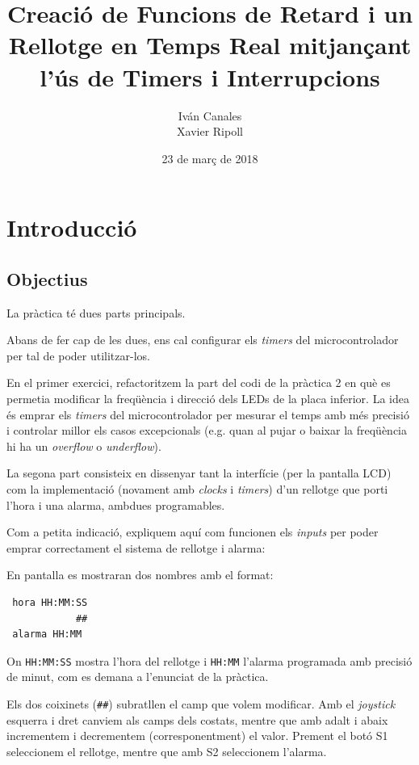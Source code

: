 \documentclass{../pdae} %
\title{Creació de Funcions de Retard i un Rellotge en Temps Real mitjançant
l’ús de Timers i Interrupcions}
\author{
    Iván Canales\\
    Xavier Ripoll
}
\date{23 de març de 2018}
\begin{document}
\maketitle

\section{Introducció}

\subsection{Objectius}

La pràctica té dues parts principals.

Abans de fer cap de les dues, ens cal configurar els \textit{timers} del
microcontrolador per tal de poder utilitzar-los.

En el primer exercici, refactoritzem la part del
codi de la pràctica 2 en què es permetia modificar la freqüència i direcció
dels LEDs de la placa inferior. La idea és emprar els \textit{timers} del
microcontrolador per mesurar el temps amb més precisió i controlar millor
els casos excepcionals (e.g. quan al pujar o baixar la freqüència hi ha un
\textit{overflow} o \textit{underflow}).

La segona part consisteix en dissenyar tant la interfície (per la pantalla LCD)
com la implementació (novament amb \textit{clocks} i \textit{timers}) d'un
rellotge que porti l'hora i una alarma, ambdues programables.

Com a petita indicació, expliquem aquí com funcionen els \textit{inputs} per
poder emprar correctament el sistema de rellotge i alarma:

En pantalla es mostraran dos nombres amb el format:

\begin{lstlisting}
 hora HH:MM:SS
            ##
 alarma HH:MM

\end{lstlisting}

On \texttt{HH:MM:SS} mostra l'hora del rellotge i \texttt{HH:MM} l'alarma
programada amb precisió de minut, com es demana a l'enunciat de la pràctica.

Els dos coixinets (\texttt{\#\#}) subratllen el camp que volem modificar.
Amb el \textit{joystick} esquerra i dret canviem als camps dels costats,
mentre que amb adalt i abaix incrementem i decrementem (corresponentment)
el valor. Prement el botó S1 seleccionem el rellotge, mentre que amb S2
seleccionem l'alarma.
\end{document}
